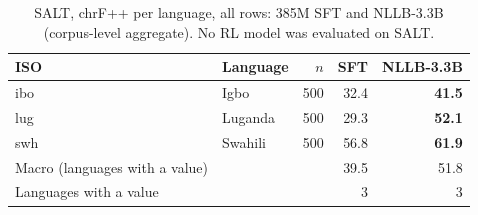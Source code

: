 \begin{table}[t]
\centering\footnotesize
\setlength{\tabcolsep}{3pt}
\begin{tabular}{@{}llrrr@{}}
\toprule
ISO & Language & $n$ & SFT & NLLB-3.3B \\
\midrule
ibo & Igbo & 500 & 32.4 & \textbf{41.5} \\
lug & Luganda & 500 & 29.3 & \textbf{52.1} \\
swh & Swahili & 500 & 56.8 & \textbf{61.9} \\
\midrule
Macro (languages with a value) & & & 39.5 & 51.8 \\
Languages with a value & & & 3 & 3 \\
\bottomrule
\end{tabular}
\caption{SALT, chrF++ per language, all rows: 385M SFT and NLLB-3.3B (corpus-level aggregate). No RL model was evaluated on SALT.}
\label{tab:full-salt-chrfpp}
\end{table}
